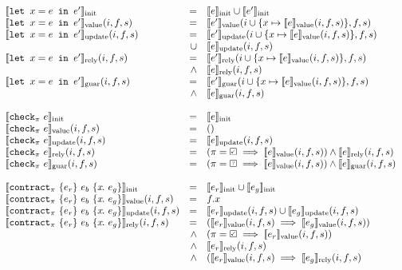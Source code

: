 \begin{figure}
\[\begin{array}{lrl}
    \\
    \sysinit{\xlet{x}{e}{e'}} & = & \sysinit{e} \cup \sysinit{e'} \\
    \sysvalue{\xlet{x}{e}{e'}}(i, f, s) & = & \sysvalue{e'}(i \cup \{ x \mapsto \sysvalue{e}(i, f, s)\}, f, s) \\
    \sysupdate{\xlet{x}{e}{e'}}(i, f, s) & = & \sysupdate{e'}(i \cup \{ x \mapsto \sysvalue{e}(i, f, s)\}, f, s) \\
      & \cup & \sysupdate{e}(i, f, s) \\
    \sysrely{\xlet{x}{e}{e'}}(i, f, s) & = & \sysrely{e'}(i \cup \{ x \mapsto \sysvalue{e}(i, f, s)\}, f, s) \\
      & \wedge & \sysrely{e}(i, f, s) \\
    \sysguar{\xlet{x}{e}{e'}}(i, f, s) & = & \sysguar{e'}(i \cup \{ x \mapsto \sysvalue{e}(i, f, s)\}, f, s) \\
      & \wedge & \sysguar{e}(i, f, s) \\
    \\
    \sysinit{\xcheckP{\PStatus}{e}} & = & \sysinit{e} \\
    \sysvalue{\xcheckP{\PStatus}{e}}(i, f, s) & = & () \\
    \sysupdate{\xcheckP{\PStatus}{e}}(i, f, s) & = & \sysupdate{e}(i, f, s) \\
    \sysrely{\xcheckP{\PStatus}{e}}(i, f, s) & = & (\PStatus = \PSValid \implies \sysvalue{e}(i, f, s)) \wedge \sysrely{e}(i, f, s) \\
    \sysguar{\xcheckP{\PStatus}{e}}(i, f, s) & = & (\PStatus = \PSUnknown \implies \sysvalue{e}(i, f, s)) \wedge \sysguar{e}(i, f, s) \\
    \\
    \sysinit{\xctr} & = & \sysinit{e_r} \cup \sysinit{e_g} \\
    \sysvalue{\xctr}(i, f, s) & = & f.x \\
    \sysupdate{\xctr}(i, f, s) & = & \sysupdate{e_r}(i, f, s) \cup \sysupdate{e_g}(i, f, s) \\
    \sysrely{\xctr}(i, f, s) & = & (\sysvalue{e_r}(i, f, s) \implies \sysvalue{e_g}(i, f, s)) \\
                            & \wedge & (\PStatus = \PSValid \implies \sysvalue{e_r}(i, f, s)) \\
                            & \wedge & \sysrely{e_r}(i, f, s) \\
                            & \wedge & (\sysvalue{e_r}(i, f, s) \implies \sysrely{e_g}(i, f, s) \\

\end{array}\]
\end{figure}

